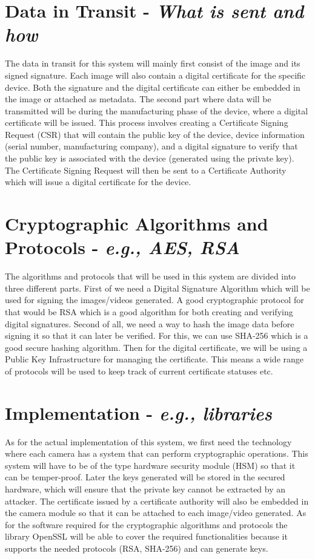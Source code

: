 \documentclass[9pt]{extarticle}
\begin{document}
\section{Data in Transit - \textit{What is sent and how}} \label{section:dit}
The data in transit for this system will mainly first consist of the image and its signed signature. Each image will also contain a digital certificate for the specific device. Both the signature and the digital certificate can either be embedded in the image or attached as metadata. The second part where data will be transmitted will be during the manufacturing phase of the device, where a digital certificate will be issued. This process involves creating a Certificate Signing Request (CSR) \cite{WhatisaC17:online} that will contain the public key of the device, device information (serial number, manufacturing company), and a digital signature to verify that the public key is associated with the device (generated using the private key). The Certificate Signing Request will then be sent to a Certificate Authority which will issue a digital certificate for the device.

\section{Cryptographic Algorithms and Protocols - \textit{e.g., AES, RSA}}
The algorithms and protocols that will be used in this system are divided into three different parts. First of we need a Digital Signature Algorithm which will be used for signing the images/videos generated. A good cryptographic protocol for that would be RSA which is a good algorithm for both creating and verifying digital signatures. Second of all, we need a way to hash the image data before signing it so that it can later be verified. For this, we can use SHA-256 which is a good secure hashing algorithm. Then for the digital certificate, we will be using a Public Key Infrastructure for managing the certificate. This means a wide range of protocols will be used to keep track of current certificate statuses etc.

\section{Implementation - \textit{e.g., libraries}} \label{sec:i}
As for the actual implementation of this system, we first need the technology where each camera has a system that can perform cryptographic operations. This system will have to be of the type hardware security module (HSM) so that it can be temper-proof. Later the keys generated will be stored in the secured hardware, which will ensure that the private key cannot be extracted by an attacker. The certificate issued by a certificate authority will also be embedded in the camera module so that it can be attached to each image/video generated. As for the software required for the cryptographic algorithms and protocols the library OpenSSL will be able to cover the required functionalities because it supports the needed protocols (RSA, SHA-256) and can generate keys.
\end{document}
